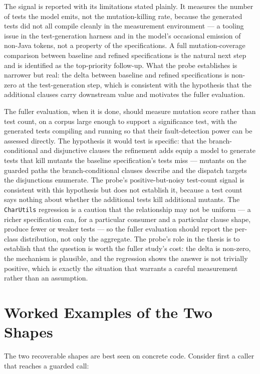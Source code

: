 The signal is reported with its limitations stated plainly. It measures the
number of tests the model emits, not the mutation-killing rate, because the
generated tests did not all compile cleanly in the measurement environment ---
a tooling issue in the test-generation harness and in the model's occasional
emission of non-Java tokens, not a property of the specifications. A full
mutation-coverage comparison between baseline and refined specifications is the
natural next step and is identified as the top-priority follow-up. What the
probe establishes is narrower but real: the delta between baseline and refined
specifications is non-zero at the test-generation step, which is consistent with
the hypothesis that the additional clauses carry downstream value and motivates
the fuller evaluation.

The fuller evaluation, when it is done, should measure mutation score rather than
test count, on a corpus large enough to support a significance test, with the
generated tests compiling and running so that their fault-detection power can be
assessed directly. The hypothesis it would test is specific: that the
branch-conditional and disjunctive clauses the refinement adds equip a model to
generate tests that kill mutants the baseline specification's tests miss --- mutants
on the guarded paths the branch-conditional clauses describe and the dispatch
targets the disjunctions enumerate. The probe's positive-but-noisy test-count
signal is consistent with this hypothesis but does not establish it, because a test
count says nothing about whether the additional tests kill additional mutants. The
\texttt{CharUtils} regression is a caution that the relationship may not be uniform
--- a richer specification can, for a particular consumer and a particular clause
shape, produce fewer or weaker tests --- so the fuller evaluation should report the
per-class distribution, not only the aggregate. The probe's role in the thesis is to
establish that the question is worth the fuller study's cost: the delta is non-zero,
the mechanism is plausible, and the regression shows the answer is not trivially
positive, which is exactly the situation that warrants a careful measurement rather
than an assumption.

\section{Worked Examples of the Two Shapes}
\label{sec:comp-examples}

The two recoverable shapes are best seen on concrete code. Consider first a
caller that reaches a guarded call:

